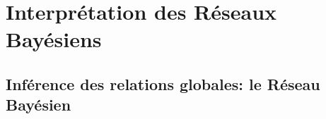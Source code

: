\documentclass[12pt]{report}
\begin{document}

    \section{Interprétation des Réseaux Bayésiens}
        \subsection{Inférence des relations globales: le Réseau Bayésien}
        \label{resBN}
        
\end{document}
